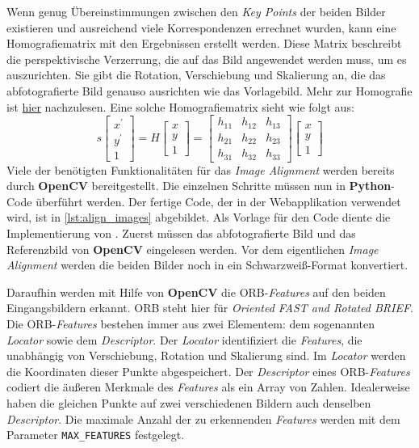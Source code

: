 Wenn genug Übereinstimmungen zwischen den \textit{Key Points} der beiden Bilder existieren und ausreichend viele Korrespondenzen errechnet wurden, kann eine 
Homografiematrix mit den Ergebnissen erstellt werden. Diese Matrix beschreibt die perspektivische Verzerrung, die auf das Bild angewendet werden muss, um es
auszurichten. Sie gibt die Rotation, Verschiebung und Skalierung an, die das abfotografierte Bild genauso ausrichten wie das Vorlagebild. Mehr zur Homografie
ist \hyperref{https://docs.opencv.org/4.x/d9/dab/tutorial_homography.html}{}{}{hier} nachzulesen.\cite{rosebrock} Eine solche Homografiematrix sieht wie folgt aus:
\[s \begin{bmatrix} x^{'} \\ y^{'} \\ 1 \end{bmatrix} 
= H \begin{bmatrix} x \\ y \\ 1 \end{bmatrix} 
= \begin{bmatrix} h_{11} & h_{12} & h_{13} \\ h_{21} & h_{22} & h_{23} \\ h_{31} & h_{32} & h_{33} \end{bmatrix} 
\begin{bmatrix} x \\ y \\ 1 \end{bmatrix}\]
Viele der benötigten Funktionalitäten für das \textit{Image Alignment} werden bereits durch \textbf{OpenCV} bereitgestellt.
Die einzelnen Schritte müssen nun in \textbf{Python}-Code überführt werden. Der fertige Code, der in der Webapplikation verwendet wird, ist in \ref{lst:align_images}
abgebildet. Als Vorlage für den Code diente die Implementierung von \citeauthor{rosebrock}. Zuerst müssen das abfotografierte Bild und das Referenzbild
von \textbf{OpenCV} eingelesen werden. Vor dem eigentlichen \textit{Image Alignment} werden die beiden Bilder noch in ein Schwarzweiß-Format konvertiert.

Daraufhin werden mit Hilfe von \textbf{OpenCV} die ORB-\textit{Features} auf den beiden Eingangsbildern erkannt.
ORB steht hier für \textit{Oriented FAST and Rotated BRIEF}. Die ORB-\textit{Features} bestehen immer aus zwei Elementem: dem sogenannten 
\textit{Locator} sowie dem \textit{Descriptor}. Der \textit{Locator} identifiziert die \textit{Features}, die unabhängig von Verschiebung, Rotation und Skalierung
sind. Im \textit{Locator} werden die Koordinaten dieser Punkte abgespeichert. Der \textit{Descriptor} eines ORB-\textit{Features} codiert die äußeren Merkmale
des \textit{Features} als ein Array von Zahlen. Idealerweise haben die gleichen Punkte auf zwei verschiedenen Bildern auch denselben \textit{Descriptor}.
Die maximale Anzahl der zu erkennenden \textit{Features} werden mit dem Parameter \texttt{MAX\_FEATURES} festgelegt.

